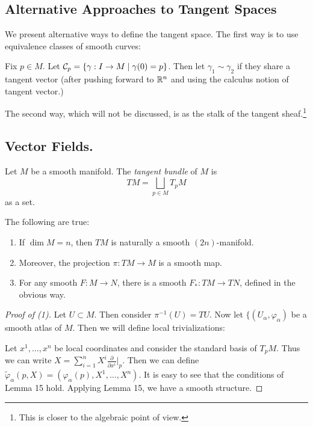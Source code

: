 \documentclass[twoside, 10pt]{article}
\begin{document}
    \subsection{Alternative Approaches to Tangent Spaces}%
    \label{sub:alternative_approaches_to_tangent_spaces}

    We present alternative ways to define the tangent space. The first way is to use equivalence classes of smooth curves:

    Fix $p \in M$. Let $\mathcal{C}_p = \{\gamma:I \to M \mid \gamma(0) = p\}$. Then let $\gamma_1 \sim \gamma_2$ if they share a tangent vector (after pushing forward to $\mathbb{R}^n$ and using the calculus notion of tangent vector.)

    The second way, which will not be discussed, is as the stalk of the tangent sheaf.\footnote{This is closer to the algebraic point of view.}

    \subsection{Vector Fields.}%
    \label{sub:vector_fields_}
    
    \begin{defn}
        Let $M$ be a smooth manifold. The \textit{tangent bundle} of $M$ is \[TM = \bigsqcup_{p \in M} T_pM\] as a set.
    \end{defn}

    \begin{thm}
        The following are true:
        \begin{enumerate}
            \item If $\dim M = n$, then $TM$ is naturally a smooth $(2n)$-manifold.
            \item Moreover, the projection $\pi:TM \to M$ is a smooth map.
            \item For any smooth $F:M \to N$, there is a smooth $F_*: TM \to TN$, defined in the obvious way.
        \end{enumerate}
    \end{thm}

    \begin{proof}[Proof of (1)]
        Let $U \subset M$. Then consider $\pi^{-1}(U) = TU$. Now let $\{(U_{\alpha}, \varphi_{\alpha})$ be a smooth atlas of $M$. Then we will define local trivializations:
        
            Let $x^1, \ldots, x^n$ be local coordinates and consider the standard basis of $T_pM$. Thus we can write $X = \sum_{i=1}^n X^i \frac{\partial}{\partial x^i} \big\vert_p$. Then we can define $\widetilde{\varphi}_{\alpha}(p,X) = (\varphi_{\alpha}(p), X^1, \ldots, X^n)$. It is easy to see that the conditions of Lemma 15 hold. Applying Lemma 15, we have a smooth structure.
    \end{proof}
\end{document}
